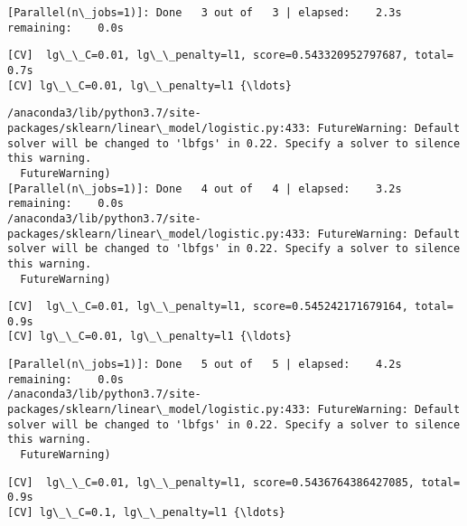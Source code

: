 \documentclass[11pt]{article}
\begin{document}
    \begin{Verbatim}[commandchars=\\\{\}]
[Parallel(n\_jobs=1)]: Done   3 out of   3 | elapsed:    2.3s remaining:    0.0s

    \end{Verbatim}

    \begin{Verbatim}[commandchars=\\\{\}]
[CV]  lg\_\_C=0.01, lg\_\_penalty=l1, score=0.543320952797687, total=   0.7s
[CV] lg\_\_C=0.01, lg\_\_penalty=l1 {\ldots}

    \end{Verbatim}

    \begin{Verbatim}[commandchars=\\\{\}]
/anaconda3/lib/python3.7/site-packages/sklearn/linear\_model/logistic.py:433: FutureWarning: Default solver will be changed to 'lbfgs' in 0.22. Specify a solver to silence this warning.
  FutureWarning)
[Parallel(n\_jobs=1)]: Done   4 out of   4 | elapsed:    3.2s remaining:    0.0s
/anaconda3/lib/python3.7/site-packages/sklearn/linear\_model/logistic.py:433: FutureWarning: Default solver will be changed to 'lbfgs' in 0.22. Specify a solver to silence this warning.
  FutureWarning)

    \end{Verbatim}

    \begin{Verbatim}[commandchars=\\\{\}]
[CV]  lg\_\_C=0.01, lg\_\_penalty=l1, score=0.545242171679164, total=   0.9s
[CV] lg\_\_C=0.01, lg\_\_penalty=l1 {\ldots}

    \end{Verbatim}

    \begin{Verbatim}[commandchars=\\\{\}]
[Parallel(n\_jobs=1)]: Done   5 out of   5 | elapsed:    4.2s remaining:    0.0s
/anaconda3/lib/python3.7/site-packages/sklearn/linear\_model/logistic.py:433: FutureWarning: Default solver will be changed to 'lbfgs' in 0.22. Specify a solver to silence this warning.
  FutureWarning)

    \end{Verbatim}

    \begin{Verbatim}[commandchars=\\\{\}]
[CV]  lg\_\_C=0.01, lg\_\_penalty=l1, score=0.5436764386427085, total=   0.9s
[CV] lg\_\_C=0.1, lg\_\_penalty=l1 {\ldots}

    \end{Verbatim}
\end{document}
